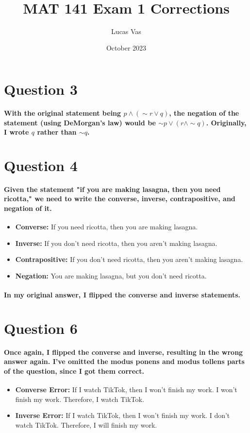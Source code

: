 \documentclass{article}
\title{MAT 141 Exam 1 Corrections}
\author{Lucas Vas}
\date{October 2023}
\begin{document}
\maketitle
\clearpage

\section{Question 3}
    \paragraph{
        With the original statement being $p \wedge (\sim r \vee q)$, the negation of the statement (using DeMorgan's law) would be $\sim p \vee (r \wedge \sim q)$. Originally, I wrote $q$ rather than $\sim q$.
    }

\section{Question 4}
    \paragraph{
        Given the statement "if you are making lasagna, then you need ricotta," we need to write the converse, inverse, contrapositive, and negation of it.
    }
    \begin{itemize}
        \item \textbf{Converse:} If you need ricotta, then you are making lasagna.
        \item \textbf{Inverse:} If you don't need ricotta, then you aren't making lasagna.
        \item \textbf{Contrapositive:} If you don't need ricotta, then you aren't making lasagna.
        \item \textbf{Negation:} You are making lasagna, but you don't need ricotta.
    \end{itemize}
    \paragraph{
        In my original answer, I flipped the converse and inverse statements.
    }

\section{Question 6}
    \paragraph{
        Once again, I flipped the converse and inverse, resulting in the wrong answer again. I've omitted the modus ponens and modus tollens parts of the question, since I got them correct.
    }
    \begin{itemize}
        \item \textbf{Converse Error:} If I watch TikTok, then I won't finish my work. I won't finish my work. Therefore, I watch TikTok.
        \item \textbf{Inverse Error:} If I watch TikTok, then I won't finish my work. I don't watch TikTok. Therefore, I will finish my work.
    \end{itemize}

\section{}
\end{document}
